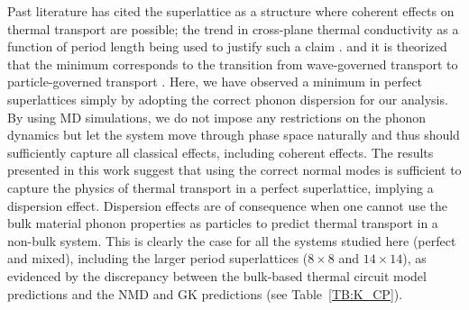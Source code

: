 
Past literature has cited the superlattice as a structure where coherent effects on thermal transport are possible; the trend in cross-plane thermal conductivity as a function of period length being used to justify such a claim \cite{PhysRevB.67.195311,PhysRevB.72.174302,PhysRevB.61.3091}. and it is theorized that the minimum corresponds to the transition from wave-governed transport to particle-governed transport \cite{PhysRevLett.84.927,PhysRevB.56.10754}. Here, we have observed a minimum in perfect superlattices simply by adopting the correct phonon dispersion for our analysis. By using MD simulations, we do not impose any restrictions on the phonon dynamics but let the system move through phase space naturally and thus should sufficiently capture all classical effects, including coherent effects. The results presented in this work suggest that using the correct normal modes is sufficient to capture the physics of thermal transport in a perfect superlattice, implying a dispersion effect. Dispersion effects are of consequence when one cannot use the bulk material phonon properties as particles to predict thermal transport in a non-bulk system. This is clearly the case for all the systems studied here (perfect and mixed), including the larger period superlattices ($8 \times 8$ and $14 \times 14$), as evidenced by the discrepancy between the bulk-based thermal circuit model predictions and the NMD and GK predictions (see Table~\ref{TB:K_CP}).

